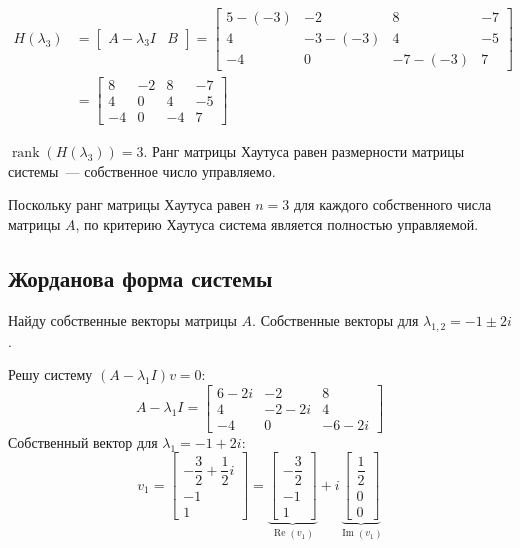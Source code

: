 \documentclass[a4paper,12pt]{article}
\begin{document}
\begin{itemize}
		\begin{align*}
			H(\lambda_3) &= \begin{bmatrix} A - \lambda_3 I & B \end{bmatrix} =
			\begin{bmatrix}
				5-(-3) & -2 & 8 & -7 \\
				4 & -3-(-3) & 4 & -5 \\
				-4 & 0 & -7-(-3) & 7
			\end{bmatrix} \\[8pt]
			&=
			\begin{bmatrix}
				8 & -2 & 8 & -7 \\
				4 & 0 & 4 & -5 \\
				-4 & 0 & -4 & 7
			\end{bmatrix}
		\end{align*}
		
		\(\operatorname{rank}(H(\lambda_3)) = 3\). Ранг матрицы Хаутуса равен размерности матрицы системы~--- собственное число управляемо.
		
	\end{itemize}
	
	
	Поскольку ранг матрицы Хаутуса равен $n = 3$ для каждого собственного числа матрицы $A$, по критерию Хаутуса система является полностью управляемой.
	
	\subsection{Жорданова форма системы}
	
	Найду собственные векторы матрицы $A$. Собственные векторы для $\lambda_{1,2} = -1 \pm 2i$.
	
	Решу систему $(A - \lambda_1 I)v = 0$:
	\[
	A - \lambda_1 I = 
	\begin{bmatrix}
		6-2i & -2 & 8 \\
		4 & -2-2i & 4 \\
		-4 & 0 & -6-2i
	\end{bmatrix}
	\]
	Собственный вектор для $\lambda_1 = -1 + 2i$:
	\[
	v_1 = \begin{bmatrix} -\dfrac{3}{2} + \dfrac{1}{2}i \\ -1 \\ 1 \end{bmatrix}
	= \underbrace{\begin{bmatrix} -\dfrac{3}{2} \\ -1 \\ 1 \end{bmatrix}}_{\operatorname{Re}(v_1)}
	+ i\underbrace{\begin{bmatrix} \dfrac{1}{2} \\ 0 \\ 0 \end{bmatrix}}_{\operatorname{Im}(v_1)}
	\]
	
\end{document}
